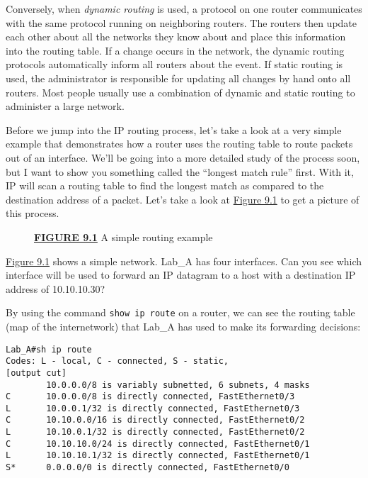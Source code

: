 Conversely, when \emph{dynamic routing} is used, a protocol on one
router communicates with the same protocol running on neighboring
routers. The routers then update each other about all the networks they
know about and place this information into the routing table. If a
change occurs in the network, the dynamic routing protocols
automatically inform all routers about the event. If static routing is
used, the administrator is responsible for updating all changes by hand
onto all routers. Most people usually use a combination of dynamic and
static routing to administer a large network.

Before we jump into the IP routing process, let's take a look at a very
simple example that demonstrates how a router uses the routing table to
route packets out of an interface. We'll be going into a more detailed
study of the process soon, but I want to show you something called the
``longest match rule'' first. With it, IP will scan a routing table to
find the longest match as compared to the destination address of a
packet. Let's take a look at
\protect\hyperlink{c09.xhtmlux5cux23figure9-1}{Figure 9.1} to get a
picture of this process.

\protect\hypertarget{c09.xhtmlux5cux23Page_360}{}{}

\begin{figure}
\centering
\caption{{\protect\hyperlink{c09.xhtmlux5cux23figureanchor9-1}{\textbf{FIGURE
9.1}} A simple routing example}}
\end{figure}

\protect\hyperlink{c09.xhtmlux5cux23figure9-1}{Figure 9.1} shows a
simple network. Lab\_A has four interfaces. Can you see which interface
will be used to forward an IP datagram to a host with a destination IP
address of 10.10.10.30?

By using the command \texttt{show\ ip\ route} on a router, we can see
the routing table (map of the internetwork) that Lab\_A has used to make
its forwarding decisions:

\begin{verbatim}
Lab_A#sh ip route
Codes: L - local, C - connected, S - static,
[output cut]
        10.0.0.0/8 is variably subnetted, 6 subnets, 4 masks
C       10.0.0.0/8 is directly connected, FastEthernet0/3
L       10.0.0.1/32 is directly connected, FastEthernet0/3
C       10.10.0.0/16 is directly connected, FastEthernet0/2
L       10.10.0.1/32 is directly connected, FastEthernet0/2
C       10.10.10.0/24 is directly connected, FastEthernet0/1
L       10.10.10.1/32 is directly connected, FastEthernet0/1
S*      0.0.0.0/0 is directly connected, FastEthernet0/0
\end{verbatim}

